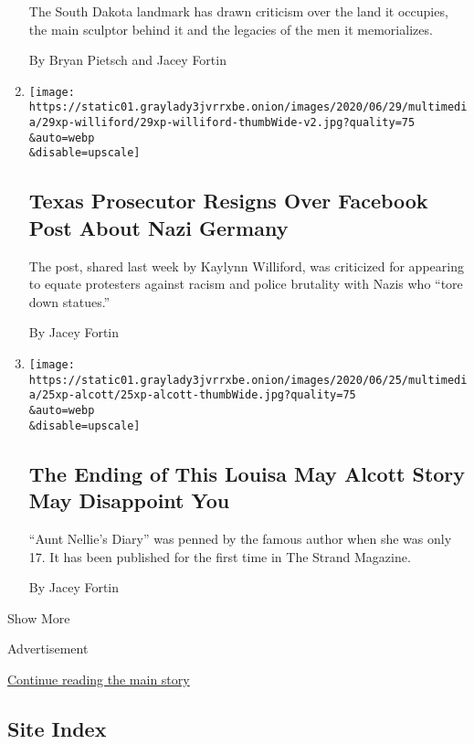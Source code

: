 \begin{enumerate}
  The South Dakota landmark has drawn criticism over the land it
  occupies, the main sculptor behind it and the legacies of the men it
  memorializes.

  By Bryan Pietsch and Jacey Fortin
\item
  \href{/2020/06/29/us/kaylynn-williford-harris-county-prosecutor-resign.html}{}

  \texttt{[image: https://static01.graylady3jvrrxbe.onion/images/2020/06/29/multimedia/29xp-williford/29xp-williford-thumbWide-v2.jpg?quality=75\\\&auto=webp\\\&disable=upscale]}

  \hypertarget{texas-prosecutor-resigns-over-facebook-post-about-nazi-germany}{%
  \subsection{Texas Prosecutor Resigns Over Facebook Post About Nazi
  Germany}\label{texas-prosecutor-resigns-over-facebook-post-about-nazi-germany}}

  The post, shared last week by Kaylynn Williford, was criticized for
  appearing to equate protesters against racism and police brutality
  with Nazis who ``tore down statues.''

  By Jacey Fortin
\item
  \href{/2020/06/25/books/louisa-may-alcott-new-story-strand.html}{}

  \texttt{[image: https://static01.graylady3jvrrxbe.onion/images/2020/06/25/multimedia/25xp-alcott/25xp-alcott-thumbWide.jpg?quality=75\\\&auto=webp\\\&disable=upscale]}

  \hypertarget{the-ending-of-this-louisa-may-alcott-story-may-disappoint-you}{%
  \subsection{The Ending of This Louisa May Alcott Story May Disappoint
  You}\label{the-ending-of-this-louisa-may-alcott-story-may-disappoint-you}}

  ``Aunt Nellie's Diary'' was penned by the famous author when she was
  only 17. It has been published for the first time in The Strand
  Magazine.

  By Jacey Fortin
\end{enumerate}

Show More

Advertisement

\protect\hyperlink{after-mid2}{Continue reading the main story}

\hypertarget{site-index}{%
\subsection{Site Index}\label{site-index}}


